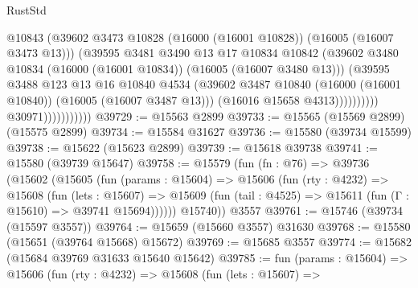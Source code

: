 \begin{lexlean}{RustStd}
\begin{coremodule}
                                        @10843
                                        (@39602
                                          @3473
                                          @10828
                                          (@16000 (@16001 @10828))
                                          (@16005 (@16007 @3473 @13)))
                                        (@39595
                                          @3481
                                          @3490
                                          @13
                                          @17
                                          @10834
                                          @10842
                                          (@39602
                                            @3480
                                            @10834
                                            (@16000 (@16001 @10834))
                                            (@16005 (@16007 @3480 @13)))
                                          (@39595
                                            @3488
                                            @123
                                            @13
                                            @16
                                            @10840
                                            @4534
                                            (@39602
                                              @3487
                                              @10840
                                              (@16000 (@16001 @10840))
                                              (@16005 (@16007 @3487 @13)))
                                            (@16016 @15658 @4313))))))))))
                          @30971)))))))))))
@39729 := @15563 @2899
@39733 := @15565 (@15569 @2899) (@15575 @2899)
@39734 := @15584 @31627
@39736 := @15580 (@39734 @15599)
@39738 := @15622 (@15623 @2899)
@39739 := @15618 @39738
@39741 := @15580 (@39739 @15647)
@39758 := @15579
    (fun (fn : @76) =>
    @39736
      (@15602
        (@15605
          (fun (params : @15604) =>
          @15606
            (fun (rty : @4232) =>
            @15608
              (fun (lets : @15607) =>
              @15609 (fun (tail : @4525) => @15611 (fun (Γ : @15610) => @39741 @15694))))))
        @15740))
    @3557
@39761 := @15746 (@39734 (@15597 @3557))
@39764 := @15659 (@15660 @3557) @31630
@39768 := @15580 (@15651 (@39764 @15668) @15672)
@39769 := @15685 @3557
@39774 := @15682 (@15684 @39769 @31633 @15640 @15642)
@39785 := fun (params : @15604) =>
  @15606
    (fun (rty : @4232) =>
    @15608
      (fun (lets : @15607) =>

\end{coremodule}
\end{lexlean}
